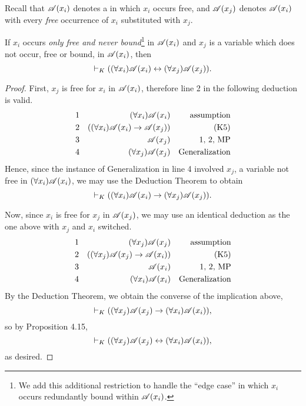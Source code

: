 Recall that \(\mathscr{A}(x_i)\) denotes a \wf{} in which \(x_i\) occurs free, and \(\mathscr{A}(x_j)\) denotes \(\mathscr{A}(x_i)\) with every \textit{free} occurrence of \(x_i\) substituted with \(x_j\).

\begin{proposition}
  If \(x_i\) occurs \textit{only free and never bound}\footnote{We add this additional restriction to handle the ``edge case'' in which \(x_i\) occurs redundantly bound within \(\mathscr{A}(x_i)\).} in \(\mathscr{A}(x_i)\) and \(x_j\) is a variable which does not occur, free or bound, in \(\mathscr{A}(x_i)\), then
    \[\vdash_{K}((\forall x_i) \mathscr{A}(x_i) \leftrightarrow (\forall x_j) \mathscr{A}(x_j)).\]

  \begin{proof}
    First, \(x_j\) is free for \(x_i\) in \(\mathscr{A}(x_i)\), therefore line 2 in the following deduction is valid.
    \begin{align*}
      \text{1}&&
      (\forall x_i)\mathscr{A}(x_i)&&
      \text{assumption}\\
      \text{2}&&
      ((\forall x_i)\mathscr{A}(x_i) \rightarrow \mathscr{A}(x_j))&&
      \text{(K5)}\\
      \text{3}&&
      \mathscr{A}(x_j)&&
      \text{1, 2, MP}\\
      \text{4}&&
      (\forall x_j)\mathscr{A}(x_j)&&
      \text{Generalization}
    \end{align*}
    Hence, since the instance of Generalization in line 4 involved \(x_j\), a variable not free in \((\forall x_i)\mathscr{A}(x_i)\), we may use the Deduction Theorem to obtain
    \[\vdash_{K} ((\forall x_i)\mathscr{A}(x_i) \rightarrow (\forall x_j)\mathscr{A}(x_j)).\]

  Now, since \(x_i\) is free for \(x_j\) in \(\mathscr{A}(x_j)\), we may use an identical deduction as the one above with \(x_j\) and \(x_i\) switched.
    \begin{align*}
      \text{1}&&
      (\forall x_j)\mathscr{A}(x_j)&&
      \text{assumption}\\
      \text{2}&&
      ((\forall x_j)\mathscr{A}(x_j) \rightarrow \mathscr{A}(x_i))&&
      \text{(K5)}\\
      \text{3}&&
      \mathscr{A}(x_i)&&
      \text{1, 2, MP}\\
      \text{4}&&
      (\forall x_i)\mathscr{A}(x_i)&&
      \text{Generalization}
    \end{align*}
    By the Deduction Theorem, we obtain the converse of the implication above,
      \[\vdash_{K} ((\forall x_j)\mathscr{A}(x_j) \rightarrow (\forall x_i)\mathscr{A}(x_i)),\]
    so by Proposition 4.15,
      \[\vdash_{K} ((\forall x_j)\mathscr{A}(x_j) \leftrightarrow (\forall x_i)\mathscr{A}(x_i)),\]
    as desired.
  \end{proof}
\end{proposition}

